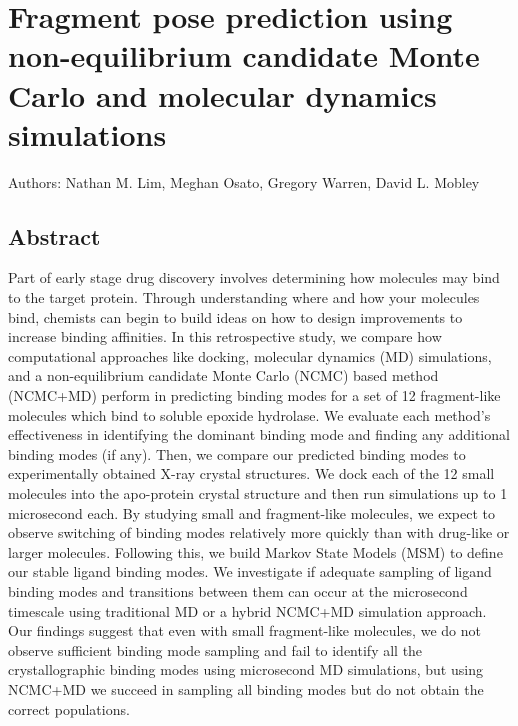 \chapter{Fragment pose prediction using non-equilibrium candidate Monte Carlo and molecular dynamics simulations} \label{SEH-BLUES}

\small{Authors: Nathan M. Lim, Meghan Osato, Gregory Warren, David L. Mobley}\\

\section{Abstract}
Part of early stage drug discovery involves determining how molecules may bind to the target protein.
Through understanding where and how your molecules bind, chemists can begin to build ideas on how to design improvements to increase binding affinities.
In this retrospective study, we compare how computational approaches like docking, molecular dynamics (MD) simulations, and a non-equilibrium candidate Monte Carlo (NCMC) based method (NCMC+MD) perform in predicting binding modes for a set of 12 fragment-like molecules which bind to soluble epoxide hydrolase.
We evaluate each method's effectiveness in identifying the dominant binding mode and finding any additional binding modes (if any).
Then, we compare our predicted binding modes to experimentally obtained X-ray crystal structures.
We dock each of the 12 small molecules into the apo-protein crystal structure and then run simulations up to 1 microsecond each.
By studying small and fragment-like molecules, we expect to observe switching of binding modes relatively more quickly than with drug-like or larger molecules.
Following this, we build Markov State Models (MSM) to define our stable ligand binding modes.
We investigate if adequate sampling of ligand binding modes and transitions between them can occur at the microsecond timescale using traditional MD or a hybrid NCMC+MD simulation approach.
Our findings suggest that even with small fragment-like molecules, we do not observe sufficient binding mode sampling and fail to identify all the crystallographic binding modes using microsecond MD simulations, but using NCMC+MD we succeed in sampling all binding modes but do not obtain the correct populations.


